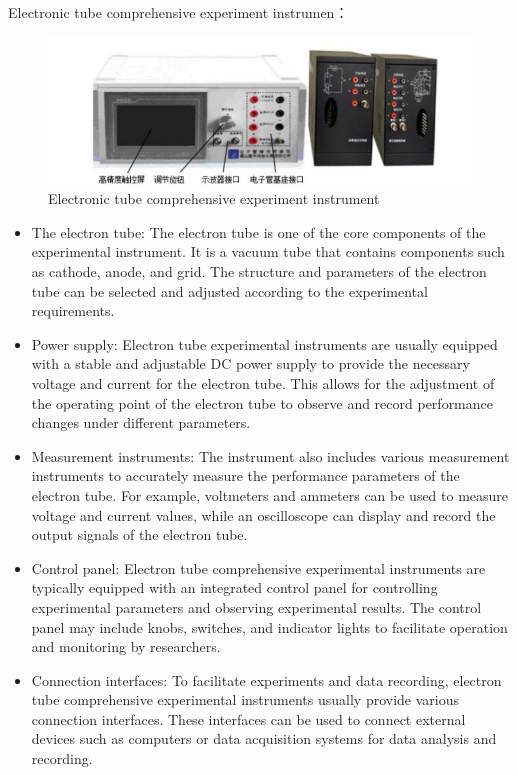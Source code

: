 \documentclass[UTF8]{article}
\begin{document}
    Electronic tube comprehensive experiment instrumen：
    		\begin{figure}[H]
    	\centering
    	\includegraphics[clip,scale=1,trim={0 0 0 0}]{fig/fig2.png}
        \caption{Electronic tube comprehensive experiment instrument}
        \label{figure.2}
            \end{figure} 
            
    \begin{itemize}
      \item The electron tube: The electron tube is one of the core components of the experimental instrument. It is a vacuum tube that contains components such as cathode, anode, and grid. The structure and parameters of the electron tube can be selected and adjusted according to the experimental requirements.
      
      \item Power supply: Electron tube experimental instruments are usually equipped with a stable and adjustable DC power supply to provide the necessary voltage and current for the electron tube. This allows for the adjustment of the operating point of the electron tube to observe and record performance changes under different parameters.
      
      \item Measurement instruments: The instrument also includes various measurement instruments to accurately measure the performance parameters of the electron tube. For example, voltmeters and ammeters can be used to measure voltage and current values, while an oscilloscope can display and record the output signals of the electron tube.
      
      \item Control panel: Electron tube comprehensive experimental instruments are typically equipped with an integrated control panel for controlling experimental parameters and observing experimental results. The control panel may include knobs, switches, and indicator lights to facilitate operation and monitoring by researchers.
      
      \item Connection interfaces: To facilitate experiments and data recording, electron tube comprehensive experimental instruments usually provide various connection interfaces. These interfaces can be used to connect external devices such as computers or data acquisition systems for data analysis and recording.
    \end{itemize}
    
\end{document}
